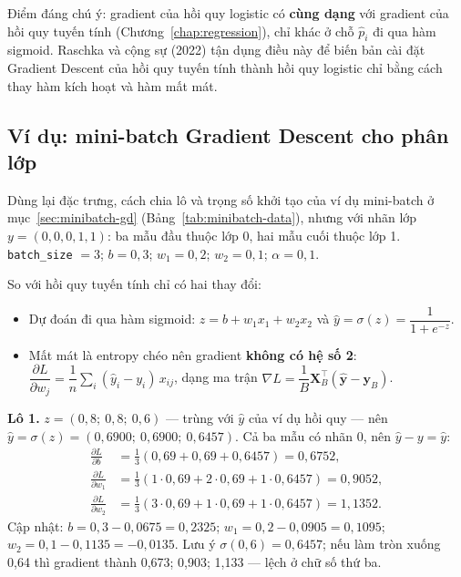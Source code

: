 Điểm đáng chú ý: gradient của hồi quy logistic có \textbf{cùng dạng} với gradient của hồi quy tuyến tính (Chương~\ref{chap:regression}), chỉ khác ở chỗ $\hat{p}_i$ đi qua hàm sigmoid. Raschka và cộng sự (2022) tận dụng điều này để biến bản cài đặt Gradient Descent của hồi quy tuyến tính thành hồi quy logistic chỉ bằng cách thay hàm kích hoạt và hàm mất mát.

\subsection{Ví dụ: mini-batch Gradient Descent cho phân lớp}
\label{sec:minibatch-logreg}

\begin{example}
Dùng lại đặc trưng, cách chia lô và trọng số khởi tạo của ví dụ mini-batch ở mục~\ref{sec:minibatch-gd} (Bảng~\ref{tab:minibatch-data}), nhưng với nhãn lớp $y = (0, 0, 0, 1, 1)$: ba mẫu đầu thuộc lớp 0, hai mẫu cuối thuộc lớp 1. \texttt{batch\_size} $= 3$; $b = 0{,}3$; $w_1 = 0{,}2$; $w_2 = 0{,}1$; $\alpha = 0{,}1$.
\end{example}

So với hồi quy tuyến tính chỉ có hai thay đổi:
\begin{itemize}
    \item Dự đoán đi qua hàm sigmoid: $z = b + w_1 x_1 + w_2 x_2$ và $\hat{y} = \sigma(z) = \dfrac{1}{1 + e^{-z}}$.
    \item Mất mát là entropy chéo nên gradient \textbf{không có hệ số 2}: $\dfrac{\partial L}{\partial w_j} = \dfrac{1}{n}\sum_i(\hat{y}_i - y_i)\,x_{ij}$, dạng ma trận $\nabla L = \dfrac{1}{B}\mathbf{X}_B^\top(\hat{\mathbf{y}} - \mathbf{y}_B)$.
\end{itemize}

\noindent\textbf{Lô 1.} $z = (0{,}8;\ 0{,}8;\ 0{,}6)$ --- trùng với $\hat{y}$ của ví dụ hồi quy --- nên $\hat{y} = \sigma(z) = (0{,}6900;\ 0{,}6900;\ 0{,}6457)$. Cả ba mẫu có nhãn 0, nên $\hat{y} - y = \hat{y}$:
\begin{align*}
    \frac{\partial L}{\partial b} &= \tfrac{1}{3}(0{,}69 + 0{,}69 + 0{,}6457) = 0{,}6752,\\
    \frac{\partial L}{\partial w_1} &= \tfrac{1}{3}(1 \cdot 0{,}69 + 2 \cdot 0{,}69 + 1 \cdot 0{,}6457) = 0{,}9052,\\
    \frac{\partial L}{\partial w_2} &= \tfrac{1}{3}(3 \cdot 0{,}69 + 1 \cdot 0{,}69 + 1 \cdot 0{,}6457) = 1{,}1352.
\end{align*}
Cập nhật: $b = 0{,}3 - 0{,}0675 = 0{,}2325$; $w_1 = 0{,}2 - 0{,}0905 = 0{,}1095$; $w_2 = 0{,}1 - 0{,}1135 = -0{,}0135$. Lưu ý $\sigma(0{,}6) = 0{,}6457$; nếu làm tròn xuống 0,64 thì gradient thành 0,673; 0,903; 1,133 --- lệch ở chữ số thứ ba.

